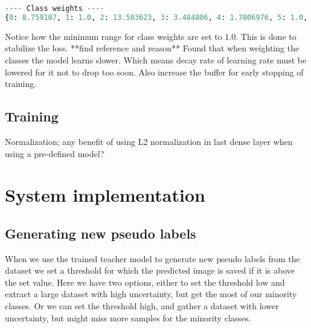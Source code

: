 \documentclass[thesis.tex]{subfiles}
\begin{document}
\begin{lstlisting}[language=Python]
---- Class weights ----
{0: 8.759107, 1: 1.0, 2: 13.503623, 3: 3.484806, 4: 1.7806976, 5: 1.0, 6: 81.021736, 7: 1.0, 8: 1.1492445, 9: 46.298138, 10: 11.574534, 11: 1.0, 12: 54.014492, 13: 1.0, 14: 3.5613952, 15: 1.0, 16: 1.0454417, 17: 17.057209, 18: 1.0, 19: 1.1871318, 20: 2.3149068, 21: 1.0, 22: 1.0}
\end{lstlisting}

Notice how the minimum range for class weights are set to 1.0. This is done to stabilize the loss. **find reference and reason**
Found that when weighting the classes the model learns slower. Which means decay rate of learning rate must be lowered for it not to drop too soon. Also increase the buffer for early stopping of training.



\subsection{Training}
Normalization; any benefit of using L2 normalization in last dense layer when using a pre-defined model?



\section{System implementation} \label{sec:system_implementation}


\subsection{Generating new pseudo labels}
When we use the trained teacher model to generate new pseudo labels from the dataset we set a threshold for which the predicted image is saved if it is above the set value. Here we have two options, either to set the threshold low and extract a large dataset with high uncertainty, but get the most of our minority classes. Or we can set the threshold high, and gather a dataset with lower uncertainty, but might miss more samples for the minority classes.
\end{document}
